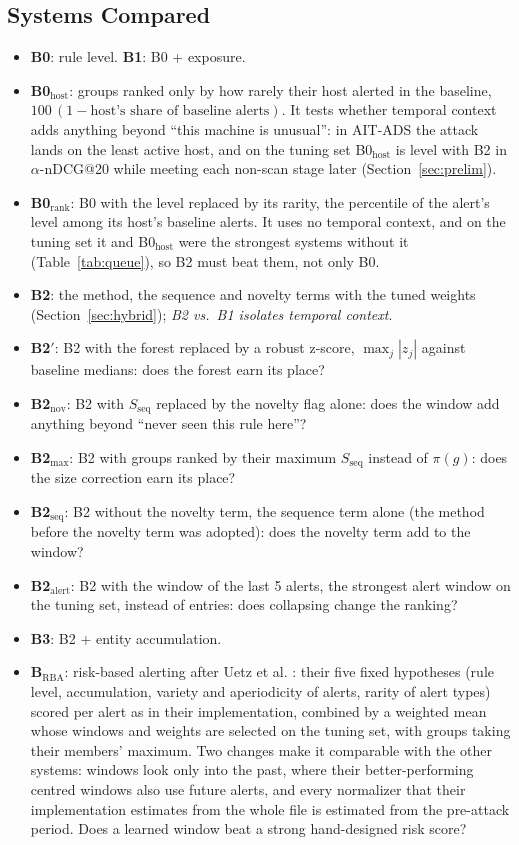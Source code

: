 \documentclass[conference]{IEEEtran}
\begin{document}
\subsection{Systems Compared}

\begin{itemize}
\item \textbf{B0}: rule level. \textbf{B1}: B0 + exposure.
\item \textbf{B0$_\mathrm{host}$}: groups ranked only by how rarely their host alerted in the baseline, $100\,(1 - \text{host's share of baseline alerts})$. It tests whether temporal context adds anything beyond ``this machine is unusual'': in AIT-ADS the attack lands on the least active host, and on the tuning set B0$_\mathrm{host}$ is level with B2 in $\alpha$-nDCG@20 while meeting each non-scan stage later (Section~\ref{sec:prelim}).
\item \textbf{B0$_\mathrm{rank}$}: B0 with the level replaced by its rarity, the percentile of the alert's level among its host's baseline alerts. It uses no temporal context, and on the tuning set it and B0$_\mathrm{host}$ were the strongest systems without it (Table~\ref{tab:queue}), so B2 must beat them, not only B0.
\item \textbf{B2}: the method, the sequence and novelty terms with the tuned weights (Section~\ref{sec:hybrid}); \emph{B2 vs.\ B1 isolates temporal context}.
\item \textbf{B2$'$}: B2 with the forest replaced by a robust z-score, $\max_j |z_j|$ against baseline medians: does the forest earn its place?
\item \textbf{B2$_\mathrm{nov}$}: B2 with $S_\mathrm{seq}$ replaced by the novelty flag alone: does the window add anything beyond ``never seen this rule here''?
\item \textbf{B2$_\mathrm{max}$}: B2 with groups ranked by their maximum $S_\mathrm{seq}$ instead of $\pi(g)$: does the size correction earn its place?
\item \textbf{B2$_\mathrm{seq}$}: B2 without the novelty term, the sequence term alone (the method before the novelty term was adopted): does the novelty term add to the window?
\item \textbf{B2$_\mathrm{alert}$}: B2 with the window of the last 5 alerts, the strongest alert window on the tuning set, instead of entries: does collapsing change the ranking?
\item \textbf{B3}: B2 + entity accumulation.
\item \textbf{B$_\mathrm{RBA}$}: risk-based alerting after Uetz et al. \cite{ref26}: their five fixed hypotheses (rule level, accumulation, variety and aperiodicity of alerts, rarity of alert types) scored per alert as in their implementation, combined by a weighted mean whose windows and weights are selected on the tuning set, with groups taking their members' maximum. Two changes make it comparable with the other systems: windows look only into the past, where their better-performing centred windows also use future alerts, and every normalizer that their implementation estimates from the whole file is estimated from the pre-attack period. Does a learned window beat a strong hand-designed risk score?
\end{itemize}
\end{document}
